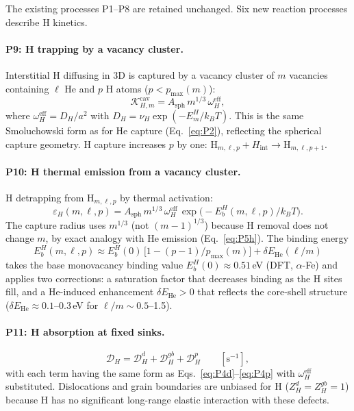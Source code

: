 \documentclass[pdflatex,sn-basic]{sn-jnl} %
\begin{document}
The existing processes P1--P8 are retained unchanged.  Six new reaction
processes describe H kinetics.

\paragraph{P9: H trapping by a vacancy cluster.}
Interstitial H diffusing in 3D is captured by a vacancy cluster of $m$
vacancies containing $\ell$ He and $p$ H atoms
($p < p_{\max}(m)$):
\begin{equation}\label{eq:P9}
    \mathcal{K}_{H,m}^{\mathrm{cav}}
    = A_{\mathrm{sph}}\,m^{1/3}\,\omega_H^{\mathrm{eff}},
\end{equation}
where $\omega_H^{\mathrm{eff}} = D_H / a^2$ with
$D_H = \nu_H \exp(-E_m^H / k_B T)$.  This is the same Smoluchowski
form as for He capture (Eq.~\ref{eq:P2}), reflecting the spherical
capture geometry.  H capture increases $p$ by one:
$\mathrm{H}_{m,\ell,p} + H_{\mathrm{int}} \to \mathrm{H}_{m,\ell,p+1}$.

\paragraph{P10: H thermal emission from a vacancy cluster.}
H detrapping from $\mathrm{H}_{m,\ell,p}$ by thermal activation:
\begin{equation}\label{eq:P10}
    \varepsilon_H(m,\ell,p)
    = A_{\mathrm{sph}}\,m^{1/3}\,\omega_H^{\mathrm{eff}}\,
      \exp\!\bigl(-E_b^H(m,\ell,p)/k_BT\bigr).
\end{equation}
The capture radius uses $m^{1/3}$ (not $(m{-}1)^{1/3}$) because H removal
does not change $m$, by exact analogy with He emission (Eq.~\ref{eq:P5h}).
The binding energy
\begin{equation}\label{eq:EbH}
    E_b^H(m,\ell,p)
    \approx E_b^H(0)\,\bigl[1 - (p-1)/p_{\max}(m)\bigr]
    + \delta E_{\mathrm{He}}(\ell/m)
\end{equation}
takes the base monovacancy binding value
$E_b^H(0) \approx 0.51$\,eV (DFT, $\alpha$-Fe) and applies two
corrections: a saturation factor that decreases binding as the H
sites fill, and a He-induced enhancement $\delta E_{\mathrm{He}} > 0$
that reflects the core-shell structure
($\delta E_{\mathrm{He}} \approx 0.1$--0.3\,eV for
$\ell/m \sim 0.5$--1.5).

\paragraph{P11: H absorption at fixed sinks.}
\begin{equation}\label{eq:P11}
    \mathcal{D}_H = \mathcal{D}_H^d + \mathcal{D}_H^{gb} + \mathcal{D}_H^p
    \qquad [\text{s}^{-1}],
\end{equation}
with each term having the same form as Eqs.~\eqref{eq:P4d}--\eqref{eq:P4p}
with $\omega_H^{\mathrm{eff}}$ substituted.  Dislocations and grain
boundaries are unbiased for H ($Z_H^d = Z_H^{gb} = 1$) because H has
no significant long-range elastic interaction with these defects.
\end{document}
